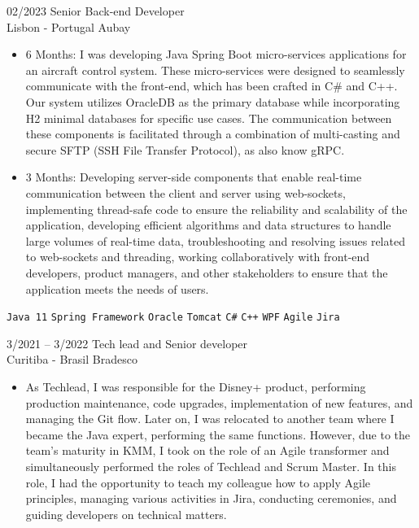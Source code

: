 \documentclass[9pt]{developercv} %
\begin{document}
\begin{entrylist}
	\entry
        {02/2023}
		{Senior Back-end Developer \\\footnotesize{Lisbon - Portugal}}
		{Aubay}
		{\vspace{-10pt}
        \begin{itemize}[noitemsep,topsep=0pt,parsep=0pt,partopsep=0pt, leftmargin=-1pt]
            \setlength\itemsep{1em}
            \item 6 Months: I was developing Java Spring Boot micro-services applications for an aircraft control system. These micro-services were designed to seamlessly communicate with the front-end, which has been crafted in C\# and C++. Our system utilizes OracleDB as the primary database while incorporating H2 minimal databases for specific use cases. The communication between these components is facilitated through a combination of multi-casting and secure SFTP (SSH File Transfer Protocol), as also know gRPC.
            \item 3 Months: Developing server-side components that enable real-time communication between the client and server using web-sockets, implementing thread-safe code to ensure the reliability and scalability of the application, developing efficient algorithms and data structures to handle large volumes of real-time data, troubleshooting and resolving issues related to web-sockets and threading, working collaboratively with front-end developers, product managers, and other stakeholders to ensure that the application meets the needs of users.
        \end{itemize} 
        \texttt{Java 11} \slashsep \texttt{Spring Framework} \slashsep \texttt{Oracle} \slashsep \texttt{Tomcat} \slashsep \texttt{C\#} \slashsep \texttt{C++} \slashsep \texttt{WPF} \slashsep \texttt{Agile} \slashsep \texttt{Jira} }
	\entry
		{3/2021 -- 3/2022}
		{Tech lead and Senior developer \\\footnotesize{Curitiba - Brasil}}
		{Bradesco}
		{\vspace{-10pt}
        \begin{itemize}[noitemsep,topsep=0pt,parsep=0pt,partopsep=0pt, leftmargin=-1pt]
            \item As Techlead, I was responsible for the Disney+ product, performing production maintenance, code upgrades, implementation of new features, and managing the Git flow. Later on, I was relocated to another team where I became the Java expert, performing the same functions. However, due to the team's maturity in KMM, I took on the role of an Agile transformer and simultaneously performed the roles of Techlead and Scrum Master. In this role, I had the opportunity to teach my colleague how to apply Agile principles, managing various activities in Jira, conducting ceremonies, and guiding developers on technical matters.

\end{itemize}}
\end{entrylist}
\end{document}

